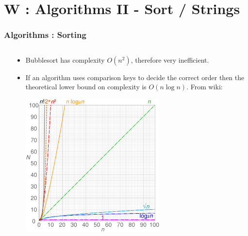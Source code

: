 \section{W : Algorithms II - Sort / Strings}
\label{chap:algos2}


\begin{frame}[fragile]
\frametitle{Algorithms : Sorting}
\begin{columns}[T]

\begin{column}{0.45\textwidth}

\end{column}

\pause
\begin{column}{0.45\textwidth}
\begin{itemize}[<+->]
\item Bubblesort has complexity $O(n^2)$, therefore very inefficient.
\item If an algorithm uses comparison keys to decide the correct order
then the theoretical lower bound on complexity is $O(n \log n )$. From wiki:
\pause
\begin{center}
\includegraphics[width=0.6\textwidth]{../Images/1280px-Comparison_computational_complexity.png}
\end{center}
\end{itemize}
\end{column}

\end{columns}
\end{frame}


